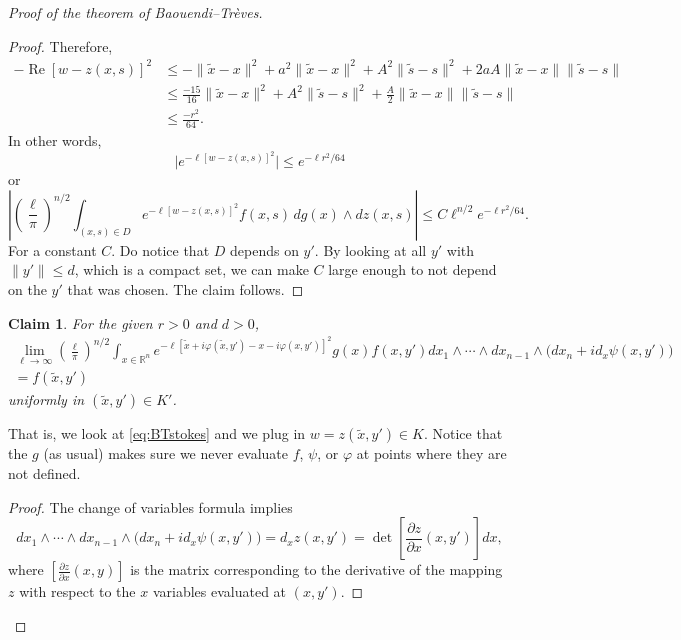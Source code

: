 \documentclass[12pt,openany]{book}
\renewcommand{\Re}{\operatorname{Re}}
\newcommand{\snorm}[1]{\lVert {#1} \rVert}
\newcommand{\babs}[1]{\bigl\lvert {#1} \bigr\rvert}
\newcommand{\abs}[1]{\left\lvert {#1} \right\rvert}
\newcommand{\R}{{\mathbb{R}}}
\theoremstyle{plain}
\newtheorem{claim}[thm]{Claim}
\theoremstyle{remark}
\theoremstyle{definition}
\theoremstyle{exercise}
\theoremstyle{example}
\begin{document}
\begin{proof}[Proof of the theorem of Baouendi--Tr{\`e}ves]
\begin{proof}
Therefore,
\begin{equation*}
\begin{split}
-\Re {[w - z(x,s)]}^2 & \leq
- \snorm{\tilde{x}-x}^2
+
a^2 \snorm{\tilde{x}-x}^2
+
A^2 \snorm{\tilde{s}-s}^2
+
2aA \snorm{\tilde{x}-x}\snorm{\tilde{s}-s}
\\
& \leq
\frac{-15}{16} \snorm{\tilde{x}-x}^2
+
A^2 \snorm{\tilde{s}-s}^2
+
\frac{A}{2} \snorm{\tilde{x}-x}\snorm{\tilde{s}-s}
\\
& \leq \frac{-r^2}{64} .
\end{split}
\end{equation*}
In other words,
\begin{equation*}
\babs{
e^{-\ell[w-z(x,s)]^2}}
\leq
e^{-\ell r^2  / 64}
\end{equation*}
or
\begin{equation*}
\abs{
{\left(\frac{\ell}{\pi}\right)}^{n/2}
\int_{(x,s)\in D}
e^{-\ell [w - z(x,s)]^2} f(x,s)
\,
dg(x) 
\wedge
dz(x,s)
}
\leq
C
\ell^{n/2}
e^{-\ell r^2  / 64} .
\end{equation*}
For a constant $C$.  Do notice that $D$ depends on $y'$.  By looking at all
$y'$ with $\snorm{y'} \leq d$, which
is a compact set, we can make $C$
large enough to not depend on the $y'$ that was chosen.
The claim follows.
\end{proof}

\begin{claim}
For the given $r>0$ and $d>0$,
\begin{multline*}
\lim_{\ell\to\infty}
{\left(\frac{\ell}{\pi}\right)}^{n/2}
\int_{x \in \R^n}
e^{  -\ell [\tilde{x}+i\varphi(\tilde{x},y') - x-i\varphi(x,y')]^2 } g(x) f(x,y')
dx_1  \wedge
\cdots \wedge
dx_{n-1}
\wedge
\bigl(dx_{n} + i d_x \psi (x,y') \bigr) 
\\
= f(\tilde{x},y')
\end{multline*}
uniformly in $(\tilde{x},y') \in K'$.
\end{claim}

That is, we look at \eqref{eq:BTstokes} and we plug in $w = z(\tilde{x},y') \in K$.
Notice that the $g$ (as usual) makes sure we never evaluate $f$, $\psi$, or
$\varphi$ at
points where they are not defined.

\begin{proof}
The change of variables formula implies
\begin{equation*}
dx_1  \wedge
\cdots \wedge
dx_{n-1}
\wedge
\bigl(dx_{n} + i d_x \psi (x,y') \bigr) 
=
d_x z(x,y')
=
\det \left[\frac{\partial z}{\partial x}(x,y')\right] dx ,
\end{equation*}
where $\left[\frac{\partial z}{\partial x}(x,y)\right]$ is the matrix
corresponding to the derivative of the mapping $z$ with respect to the $x$
variables evaluated at $(x,y')$.


\end{proof}
\end{proof}
\end{document}
